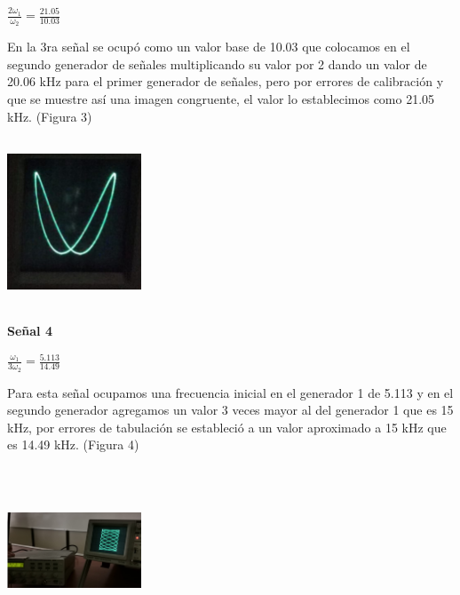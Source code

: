 \documentclass[10pt]{article}
\begin{document}
\begin{multicols}{2}
\begin{center}
$\frac{2\omega_{1}}{\omega_{2}}=\frac{21.05}{10.03}$\\
\end{center}
En la 3ra señal se ocupó como un valor base de 10.03 que colocamos en el segundo generador de señales multiplicando su valor por 2 dando un valor de 20.06 kHz para el primer generador de 
señales, pero por errores de calibración y que se muestre así una imagen congruente, el valor lo establecimos como 21.05 kHz. (Figura 3)\\

\begin{center}
	\includegraphics[width=4cm,height=5cm]{Imagenes/3.png}
	\label{fig:3}
\end{center}
\textbf{Señal 4}\\
\begin{center}
    
$\frac{\omega_{1}}{3\omega_{2}}=\frac{5.113}{14.49}$\\
\end{center}
Para esta señal ocupamos una frecuencia inicial en el generador 1 de 5.113 y en el segundo generador agregamos un valor 3 veces mayor al del generador 1 que es 15 kHz, por errores de tabulación se estableció a un valor aproximado a 15 kHz que es 14.49 kHz. (Figura 4)\\
\begin{center}
	\includegraphics[width=4cm,height=5cm]{Imagenes/4.png}
	\label{fig:4}
\end{center}


\end{multicols}
\end{document}
